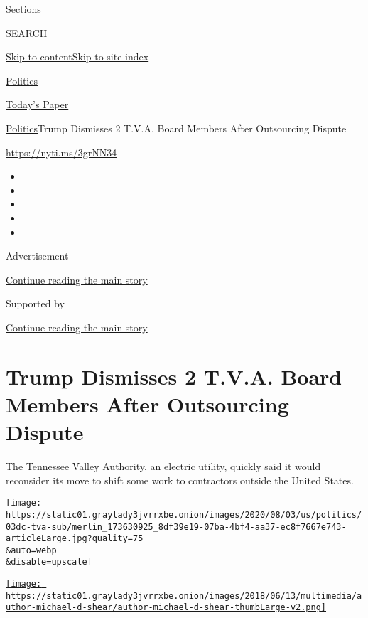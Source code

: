 Sections

SEARCH

\protect\hyperlink{site-content}{Skip to
content}\protect\hyperlink{site-index}{Skip to site index}

\href{https://www.nytimes3xbfgragh.onion/section/politics}{Politics}

\href{https://myaccount.nytimes3xbfgragh.onion/auth/login?response_type=cookie\&client_id=vi}{}

\href{https://www.nytimes3xbfgragh.onion/section/todayspaper}{Today's
Paper}

\href{/section/politics}{Politics}\textbar{}Trump Dismisses 2 T.V.A.
Board Members After Outsourcing Dispute

\url{https://nyti.ms/3grNN34}

\begin{itemize}
\item
\item
\item
\item
\item
\end{itemize}

Advertisement

\protect\hyperlink{after-top}{Continue reading the main story}

Supported by

\protect\hyperlink{after-sponsor}{Continue reading the main story}

\hypertarget{trump-dismisses-2-tva-board-members-after-outsourcing-dispute}{%
\section{Trump Dismisses 2 T.V.A. Board Members After Outsourcing
Dispute}\label{trump-dismisses-2-tva-board-members-after-outsourcing-dispute}}

The Tennessee Valley Authority, an electric utility, quickly said it
would reconsider its move to shift some work to contractors outside the
United States.

\texttt{[image: https://static01.graylady3jvrrxbe.onion/images/2020/08/03/us/politics/03dc-tva-sub/merlin\_173630925\_8df39e19-07ba-4bf4-aa37-ec8f7667e743-articleLarge.jpg?quality=75\\\&auto=webp\\\&disable=upscale]}

\href{https://www.nytimes3xbfgragh.onion/by/michael-d-shear}{\texttt{[image: https://static01.graylady3jvrrxbe.onion/images/2018/06/13/multimedia/author-michael-d-shear/author-michael-d-shear-thumbLarge-v2.png]}}

